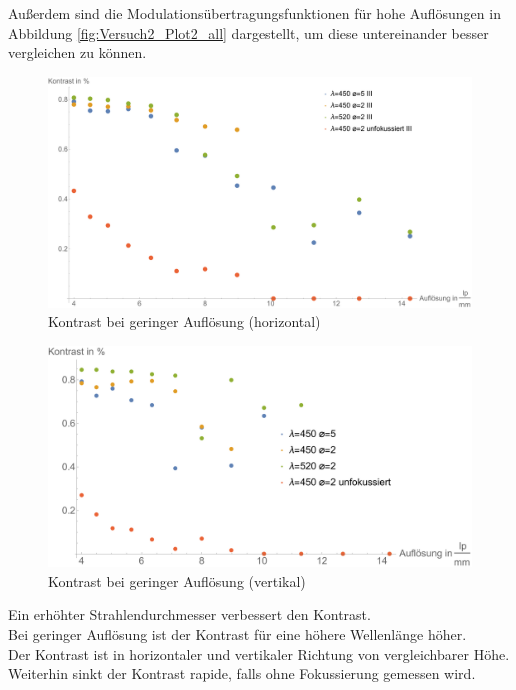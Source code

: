 Außerdem sind die Modulationsübertragungsfunktionen für hohe Auflösungen in Abbildung \ref{fig:Versuch2_Plot2_all} dargestellt, um diese untereinander besser vergleichen zu können.


\begin{minipage}{\linewidth}
\begin{figure}[H]
	\centering
\includegraphics[width=1.0\linewidth]{IMAGE/Versuch2Plot1horizontal2.pdf}
	\caption{Kontrast bei geringer Auflösung (horizontal)}
	\label{fig:Versuch2_Plot2h1}
\end{figure} 

\begin{figure}[H]
	\centering
\includegraphics[width=1.0\linewidth]{IMAGE/Versuch2Plot1vertikal2.pdf}
	\caption{Kontrast bei geringer Auflösung (vertikal)}
	\label{fig:Versuch2_Plot2v1}
\end{figure} 

Ein erhöhter Strahlendurchmesser verbessert den Kontrast.\\
Bei geringer Auflösung ist der Kontrast für eine höhere Wellenlänge höher.\\
Der Kontrast ist in horizontaler und vertikaler Richtung von vergleichbarer Höhe.\\
Weiterhin sinkt der Kontrast rapide, falls ohne Fokussierung gemessen wird.

\end{minipage}

